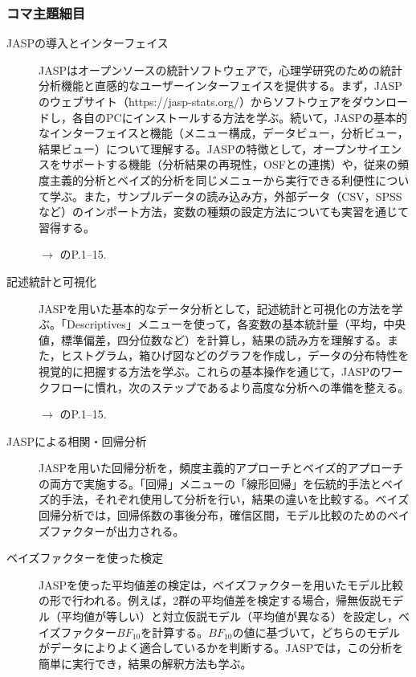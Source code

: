 \subsubsection{コマ主題細目}
\begin{description}
	\item[JASPの導入とインターフェイス] JASPはオープンソースの統計ソフトウェアで，心理学研究のための統計分析機能と直感的なユーザーインターフェイスを提供する。まず，JASPのウェブサイト（https://jasp-stats.org/）からソフトウェアをダウンロードし，各自のPCにインストールする方法を学ぶ。続いて，JASPの基本的なインターフェイスと機能（メニュー構成，データビュー，分析ビュー，結果ビュー）について理解する。JASPの特徴として，オープンサイエンスをサポートする機能（分析結果の再現性，OSFとの連携）や，従来の頻度主義的分析とベイズ的分析を同じメニューから実行できる利便性について学ぶ。また，サンプルデータの読み込み方，外部データ（CSV，SPSSなど）のインポート方法，変数の種類の設定方法についても実習を通じて習得する。
	      \begin{flushright}
		      $\to$ \textcite{YUnaShimizu2022}のP.1--15.
	      \end{flushright}

	\item[記述統計と可視化] JASPを用いた基本的なデータ分析として，記述統計と可視化の方法を学ぶ。「Descriptives」メニューを使って，各変数の基本統計量（平均，中央値，標準偏差，四分位数など）を計算し，結果の読み方を理解する。また，ヒストグラム，箱ひげ図などのグラフを作成し，データの分布特性を視覚的に把握する方法を学ぶ。これらの基本操作を通じて，JASPのワークフローに慣れ，次のステップであるより高度な分析への準備を整える。
		\begin{flushright}
		      $\to$ \textcite{YUnaShimizu2022}のP.1--15.
	      \end{flushright}

	\item[JASPによる相関・回帰分析] JASPを用いた回帰分析を，頻度主義的アプローチとベイズ的アプローチの両方で実施する。「回帰」メニューの「線形回帰」を伝統的手法とベイズ的手法，それぞれ使用して分析を行い，結果の違いを比較する。ベイズ回帰分析では，回帰係数の事後分布，確信区間，モデル比較のためのベイズファクターが出力される。

	\item[ベイズファクターを使った検定] JASPを使った平均値差の検定は，ベイズファクターを用いたモデル比較の形で行われる。例えば，2群の平均値差を検定する場合，帰無仮説モデル（平均値が等しい）と対立仮説モデル（平均値が異なる）を設定し，ベイズファクター$BF_{10}$を計算する。$BF_{10}$の値に基づいて，どちらのモデルがデータによりよく適合しているかを判断する。JASPでは，この分析を簡単に実行でき，結果の解釈方法も学ぶ。

\end{description}
